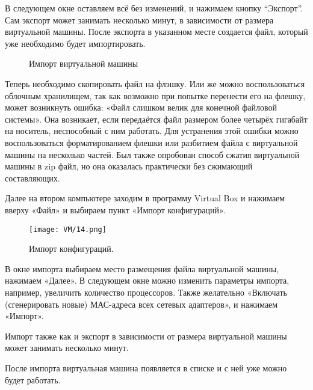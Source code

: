 \quad В следующем окне оставляем всё без изменений, и нажимаем кнопку “Экспорт”. Сам экспорт может занимать несколько минут, в зависимости от размера виртуальной машины. После экспорта в указанном месте создается файл, который уже необходимо будет импортировать.

\begin{figure}[h]
\centering Импорт виртуальной машины
\label{ris:image}
\end{figure}

\quad Теперь необходимо скопировать файл на флэшку. Или же можно воспользоваться облочным хранилищем, так как возможно при попытке перенести его на флешку, может возникнуть ошибка: «Файл слишком велик для конечной файловой системы». Она возникает, если передаётся файл размером более четырёх гигабайт на носитель, неспособный с ним работать. Для устранения этой ошибки можно воспользоваться форматированием флешки или разбитием файла с виртуальной машины на несколько частей. Был также опробован способ сжатия виртуальной машины в zip файл, но она оказалась практически без сжимающий составляющих.

\quad Далее на втором компьютере заходим в программу Virtual Box и нажимаем вверху «Файл» и выбираем пункт «Импорт конфигураций».

\begin{figure}[h]
		\centering
		\texttt{[image: VM/14.png]}
\caption{Импорт конфигураций.}
\label{ris:image}
\end{figure}

\quad В окне импорта выбираем место размещения файла виртуальной машины, нажимаем «Далее». В следующем окне можно изменить параметры импорта, например, увеличить количество процессоров. Также желательно «Включать (сгенерировать новые) МАС-адреса всех сетевых адаптеров», и нажимаем «Импорт».

\quad Импорт также как и экспорт в зависимости от размера виртуальной машины может занимать несколько минут.

\quad После импорта виртуальная машина появляется в списке и с ней уже можно будет работать.